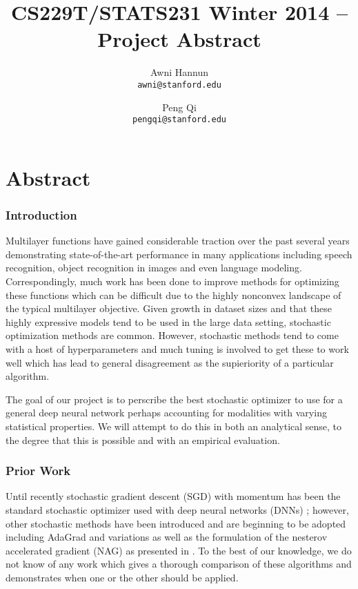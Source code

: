 \documentclass[12pt,english]{article}
\title{
CS229T/STATS231 Winter 2014 -- Project Abstract
}
\author{
Awni Hannun \\
\texttt{awni@stanford.edu}
\and
Peng Qi \\
\texttt{pengqi@stanford.edu}
}
\newcommand{\1}{\mathbb{I}} %
\begin{document}
\maketitle

\section*{Abstract}

\subsubsection*{Introduction}

Multilayer functions have gained considerable traction over the past several
years demonstrating state-of-the-art performance in many applications including
speech recognition, object recognition in images and even language modeling.
Correspondingly, much work has been done to improve methods for optimizing
these functions which can be difficult due to the highly nonconvex landscape of
the typical multilayer objective. Given growth in dataset sizes and that these
highly expressive models tend to be used in the large data setting, stochastic
optimization methods are common. However, stochastic methods tend to come with
a host of hyperparameters and much tuning is involved to get these to work well
which has lead to general disagreement as the supieriority of a particular
algorithm. 

The goal of our project is to perscribe the best stochastic optimizer to use
for a general deep neural network perhaps accounting for modalities with
varying statistical properties. We will attempt to do this in both an
analytical sense, to the degree that this is possible and with an empirical
evaluation. 

\subsubsection*{Prior Work}\label{prior_work}

Until recently stochastic gradient descent (SGD) with momentum has been the
standard stochastic optimizer used with deep neural networks (DNNs)
\cite{hinton_guide_tr}; however, other stochastic methods have been introduced
and are beginning to be adopted including AdaGrad \cite{duchi_adagrad} and
variations as well as the formulation of the nesterov accelerated gradient
(NAG) as presented in \cite{sutskever_nag}. To the best of our knowledge, we do
not know of any work which gives a thorough comparison of these algorithms and
demonstrates when one or the other should be applied.  
\end{document}
